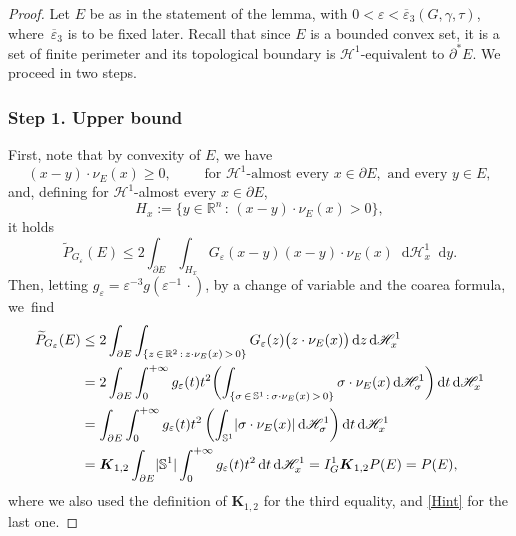 \documentclass[JEP,XML,SOM,Unicode,published]{cedram}
\newcommand{\sep}{\,:\,}
\numberwithin{equation}{section}
\theoremstyle{plain}
\theoremstyle{definition}
\newcommand{\numberset}[1]{{\mathbb{#1}}}
\newcommand{\R}{\numberset{R}}
\newcommand{\dy}{\mathop{}\mathopen{}\mathrm{d}y}
\newcommand{\dz}{\mathop{}\mathopen{}\mathrm{d}z}
\newcommand{\dt}{\mathop{}\mathopen{}\mathrm{d}t}
\newcommand{\dH}{\mathop{}\mathopen{}\mathrm{d}\mathscr{H}}
\newcommand{\bbS}{\mathbb{S}}
\newcommand{\bfK}{\boldsymbol{K}}
\newcommand{\calH}{{\mathscr{H}}}
\let\eps\varepsilon
\let\ol\overline
\let\wt\widetilde
\newcommand{\Ren}{{\R^n}}
\DeclarePairedDelimiter{\abs}{\lvert}{\rvert}
\begin{document}
\begin{proof}
Let $E$ be as in the statement of the lemma, with $0<\eps<\ol{\eps}_3(G,\gamma,\tau)$, where~$\ol{\eps}_3$ is to be fixed later. Recall that since $E$ is a bounded convex set, it is a set of
finite perimeter and its topological boundary is $\calH^1$-equivalent to $\partial^* E$.
We proceed in two steps.

\subsubsection*{Step 1. Upper bound}
First, note that by convexity of $E$, we have
\[
(x-y)\cdot\nu_E(x)\geq 0,\qquad\text{ for }\calH^1\text{-almost every }x\in\partial E,\text{ and
every } y\in E,
\]
and, defining for $\calH^1$-almost every $x\in\partial E$,
\[
H_x:= \bigl\{ y\in \Ren \sep  (x-y)\cdot \nu_E(x)>0\bigr\},
\]
it holds
\[
\wt{P}_{G_\eps}(E)\leq 2\int_{\partial E} \int_{H_x} G_\eps(x-y) (x-y)\cdot \nu_E(x)\dH_x^1\dy.
\]
Then, letting $g_\eps=\eps^{-3}g(\eps^{-1}\,\cdot)$, by a change of variable and the coarea
formula, we~find
\[
\begin{aligned}
\wt{P}_{G_\eps}(E)
&\leq 2\int_{\partial E} \int_{\left\{z\,\in\,\R^2\sep z\cdot\nu_E(x)\,>\,0\right\}}
G_\eps(z)\big(z\cdot\nu_E(x)\big)\dz\dH_x^1\\
&=2\int_{\partial E}\int_0^{+\infty} g_\eps(t)t^2\biggl(\int_{\left\{\sigma\,\in\,\bbS^1\sep \sigma
\cdot\nu_E(x)\,>\,0\right\}} \sigma\cdot\nu_E(x)\dH^1_\sigma\biggr)\dt\dH^1_x\\
&=\int_{\partial E}\int_0^{+\infty} g_\eps(t)t^2\left(\int_{\bbS^{1}}
\abs{\sigma\cdot\nu_E(x)}\dH_\sigma^1\right)\dt\dH_x^1\\
&=\bfK_{1,2}\int_{\partial E}\abs{\bbS^1}\int_0^{+\infty} g_\eps(t)t^2\dt\dH_x^1
=I_G^1\bfK_{1,2}P(E)=P(E),
\end{aligned}
\]
where we also used the definition of $\bfK_{1,2}$ for the third equality, and \cref{Hint} for the
last one.


\end{proof}
\end{document}
